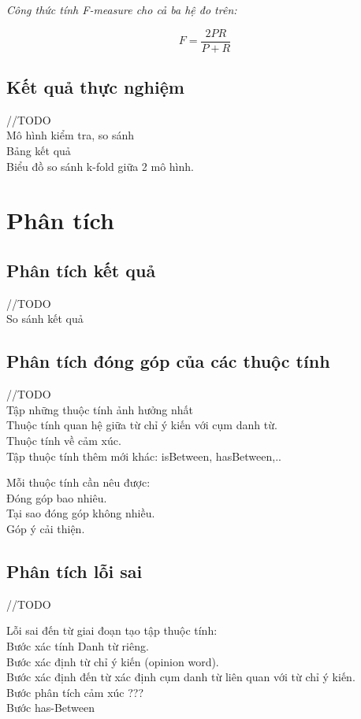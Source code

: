 \documentclass[12pt]{report}
\begin{document}
			\par \textit{Công thức tính F-measure cho cả ba hệ đo trên:}
				\begin{center}					
					\begin{equation*}
						F = \frac{2PR}{P+R}
					\end{equation*}
				\end{center}

		\subsection*{Kết quả thực nghiệm}
		//TODO
		\\Mô hình kiểm tra, so sánh
		\\Bảng kết quả
		\\Biểu đồ so sánh k-fold giữa 2 mô hình.

		\section{Phân tích}
			\subsection*{Phân tích kết quả}
			//TODO
			\\So sánh kết quả
			\subsection*{Phân tích đóng góp của các thuộc tính}
			//TODO
			\\Tập những thuộc tính ảnh hưởng nhất
			\\Thuộc tính quan hệ giữa từ chỉ ý kiến với cụm danh từ.
			\\Thuộc tính về cảm xúc.
			\\Tập thuộc tính thêm mới khác: isBetween, hasBetween,..
			\par Mỗi thuộc tính cần nêu được:
			\\Đóng góp bao nhiêu.
			\\Tại sao đóng góp không nhiều.
			\\Góp ý cải thiện.
			\subsection*{Phân tích lỗi sai}
			//TODO
			\par Lỗi sai đến từ giai đoạn tạo tập thuộc tính:
				\\Bước xác tính Danh từ riêng.
				\\Bước xác định từ chỉ ý kiến (opinion word).
				\\Bước xác định đến từ xác định cụm danh từ liên quan với từ chỉ ý kiến.
				\\Bước phân tích cảm xúc ???
				\\Bước has-Between
		
\end{document}
